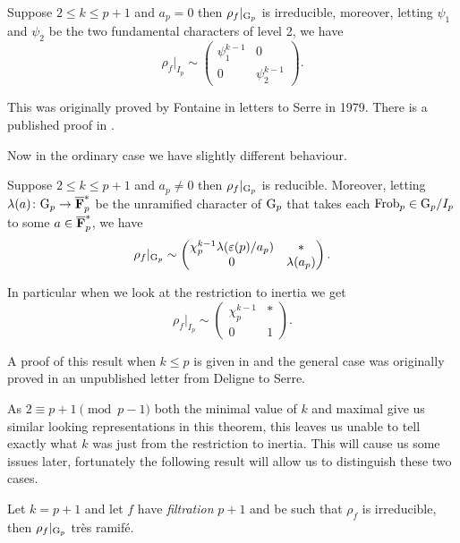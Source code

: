 \documentclass[a4paper,12pt]{article}
\begin{document}
\begin{thm}[Fontaine]\label{thm:super}
Suppose $2\le k \le p +1$ and $a_p = 0$ then $\rho_{f}|_{\mathrm{G}_p}$ is irreducible, moreover, letting $\psi_1$ and $\psi_2$ be the two fundamental characters of level 2, we have
\[
\rho_{f}|_{I_p} \sim \begin{pmatrix} \psi_1^{k-1} & 0 \\ 0 & \psi_2^{k-1}\end{pmatrix}.
\]
\end{thm}

This was originally proved by Fontaine in letters to Serre in 1979.
There is a published proof in \cite[sec. 6]{EdixhovenWeight}.

Now in the ordinary case we have slightly different behaviour.

\begin{thm}[Deligne]\label{thm:ordinary}
Suppose $2\le k\le p+1$ and $a_p \ne 0$ then $\rho_{f}|_{\mathrm{G}_p}$ is reducible.
Moreover, letting $\lambda(a)\colon \mathrm{G}_p \to \overline{\mathbf{F}}_p^*$ be the unramified character of $\mathrm{G}_p$ that takes each $\operatorname{Frob}_p \in \mathrm{G}_p /I_p$ to some $a\in\overline{\mathbf{F}}_p^*$, we have
\[
\rho_{f}|_{\mathrm{G}_p} \sim \begin{pmatrix} \chi_p^{k-1}\lambda(\varepsilon(p)/a_p) & * \\ 0 & \lambda(a_p)\end{pmatrix}.
\]

In particular when we look at the restriction to inertia we get
\[
\rho_{f}|_{I_{p}} \sim \begin{pmatrix} \chi_p^{k-1} & * \\ 0 & 1\end{pmatrix}.
\]
\end{thm}

A proof of this result when $k \le p$ is given in \cite{Gross} and the general case was originally proved in an unpublished letter from Deligne to Serre.

As $2 \equiv p + 1\pmod{p-1}$ both the minimal value of $k$ and maximal give us similar looking representations in this theorem, this leaves us unable to tell exactly what $k$ was just from the restriction to inertia.
This will cause us some issues later, fortunately the following result will allow us to distinguish these two cases.

\begin{thm}[Mazur]\label{thm:mazur}
Let $k = p + 1$ and let $f$ have \emph{filtration} $p+1$ and be such that $\rho_{f}$ is irreducible, then $\rho_{f}|_{\mathrm{G}_p}$ tr\`es ramif\'e.
\end{thm}
\end{document}
